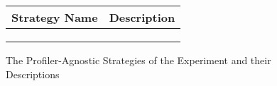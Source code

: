 \begin{figure}[htb]

  \newcommand{\desc}[1]{\parbox[t]{26em}{#1}}

  \def\desca{\desc{Uses the feature-specific profiler to identify the most
  expensive boundary. Then it equips both of its sides with deep types.}}


 \begin{tabular}{r|l}
    {\bf Strategy Name} & {\bf Description} \\\hline
    \randomopt{}        &                    \\\hline
    \randomcon{}        &                    \\\hline
    \toggle{}           &                    
     \end{tabular}

 
  \caption{The Profiler-Agnostic Strategies of the Experiment and their Descriptions}
  \label{f:astrategies}
\end{figure}


